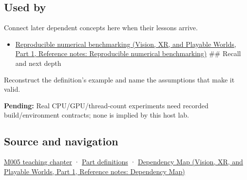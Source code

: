 \subsection{Used by}\label{appendix-5f1a2c3f97ff-used-by}

\hypertarget{appendix-5f1a2c3f97ff-used-by}{}

Connect later dependent concepts here when their lessons arrive.

\begin{itemize}
\tightlist
\item
  \href{../07-Vision-XR-and-Playable-Worlds-P01/main.pdf\#nameddest=appendix-b9db93e28371}{Reproducible numerical benchmarking (Vision, XR, and Playable Worlds, Part 1, Reference notes: Reproducible numerical benchmarking)} \#\# Recall and next depth
\end{itemize}

Reconstruct the definition's example and name the assumptions that make it valid.

\textbf{Pending:} Real CPU/GPU/thread-count experiments need recorded build/environment contracts; none is implied by this host lab.

\subsection{Source and navigation}\label{appendix-5f1a2c3f97ff-source-and-navigation}

\hypertarget{appendix-5f1a2c3f97ff-source-and-navigation}{}

\hyperref[01-foundations-i-ch001-when-arithmetic-meets-uncertainty]{M005 teaching chapter} · \hyperref[appendix-fd090d982a15-m005---parts-77-88]{Part definitions} · \href{../07-Vision-XR-and-Playable-Worlds-P01/main.pdf\#nameddest=appendix-4ad47bdd269a}{Dependency Map (Vision, XR, and Playable Worlds, Part 1, Reference notes: Dependency Map)}

